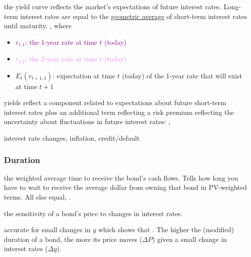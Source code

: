  the yield curve reflects the market's expectations of future interest rates.
\Ie Long-term interest rates are equal to the \underline{geometric average} of short-term interest rates until maturity.
,
where \begin{itemize}
    \item \textcolor{purple}{$r_{t,1}$: the 1-year rate at time $t$ (\eg today)}
    \item \textcolor{violet}{$r_{t,2}$: the 2-year rate at time $t$ (\eg today)}
    \item \textcolor{NavyBlue}{$E_t(r_{t+1,1})$: expectation at time $t$ (\eg today) of the 1-year rate that will exist at time $t+1$}
\end{itemize}

 yields reflect a component related to expectations about future short-term interest rates plus an
additional term reflecting a risk premium reflecting the uncertainty about fluctuations in future interest rates:
,

 interest rate changes, inflation, credit/default

\subsubsection{Duration}

 the weighted average time to receive the bond's cash flows.
Tells how long you have to wait to receive the average dollar from owning that bond in PV-weighted terms.
All else equal, .

 the sensitivity of a bond's price to changes in interest rates.

 accurate for small changes in $y$ 
which shows that .
The higher the (modified) duration of a bond, the more its price moves ($\Delta P$) given a small change in interest
rates ($\Delta y$).

